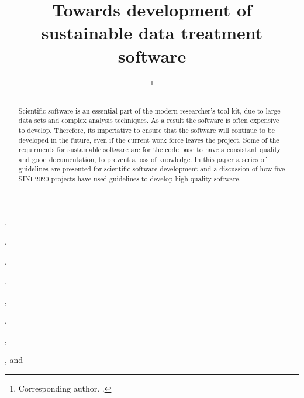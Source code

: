 \documentclass[jnr]{iosart2x}
\begin{document}
\begin{frontmatter}

\title{Towards development of sustainable data treatment software}

\author[A]{ %
\thanks{Corresponding author. .}},
\author[A]{ },
\author[A]{ },
\author[B]{ },
\author[C]{ },
\author[D]{ },
\author[A]{ },
\author[E]{ },
and
\author[A]{ }

\address[A]{,}
\address[B]{,}
\address[C]{,}
\address[D]{,}
\address[E]{,}

\begin{abstract}
Scientific software is an essential part of the modern researcher's tool kit, due to large data sets and complex analysis techniques.
As a result the software is often expensive to develop.
Therefore, its imperiative to ensure that the software will continue to be developed in the future, even if the current work force leaves the project.
Some of the requirments for sustainable software are for the code base to have a consistant quality and good documentation, to prevent a loss of knowledge.
In this paper a series of guidelines are presented for scientific software development and a discussion of how five SINE2020 projects have used guidelines to develop high quality software.

\end{abstract}

\begin{keyword}
\end{keyword}

\end{frontmatter}
\end{document}
